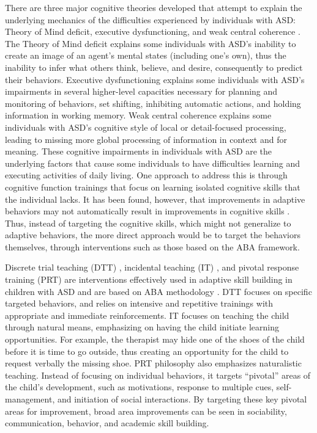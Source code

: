 There are three major cognitive theories developed that attempt to explain the underlying mechanics of the difficulties experienced by individuals with ASD: Theory of Mind deficit, executive dysfunctioning, and weak central coherence \cite{rajendran2007cognitive}.  The Theory of Mind deficit explains some individuals with ASD's inability to create an image of an agent's mental states (including one's own), thus the inability to infer what others think, believe, and desire, consequently to predict their behaviors.  Executive dysfunctioning explains some individuals with ASD's impairments in several higher-level capacities necessary for planning and monitoring of behaviors, set shifting, inhibiting automatic actions, and holding information in working memory.  Weak central coherence explains some individuals with ASD's cognitive style of local or detail-focused processing, leading to missing more global processing of information in context and for meaning.  These cognitive impairments in individuals with ASD are the underlying factors that cause some individuals to have difficulties learning and executing activities of daily living.  One approach to address this is through cognitive function trainings that focus on learning isolated cognitive skills that the individual lacks.  It has been found, however, that improvements in adaptive behaviors may not automatically result in improvements in cognitive skills \cite{chin2000teaching, teunisse2007cognitieve}.  Thus, instead of targeting the cognitive skills, which might not generalize to adaptive behaviors, the more direct approach would be to target the behaviors themselves, through interventions such as those based on the ABA framework.

Discrete trial teaching (DTT) \cite{howard2005comparison}, incidental teaching (IT) \cite{mcgee1986extension}, and pivotal response training (PRT) \cite{koegel2003teaching} are interventions effectively used in adaptive skill building in children with ASD and are based on ABA methodology \cite{palmen2013behavioral}.  DTT focuses on specific targeted behaviors, and relies on intensive and repetitive trainings with appropriate and immediate reinforcements.  IT focuses on teaching the child through natural means, emphasizing on having the child initiate learning opportunities.  For example, the therapist may hide one of the shoes of the child before it is time to go outside, thus creating an opportunity for the child to request verbally the missing shoe.  PRT philosophy also emphasizes naturalistic teaching.  Instead of focusing on individual behaviors, it targets ``pivotal'' areas of the child's development, such as motivations, response to multiple cues, self-management, and initiation of social interactions.  By targeting these key pivotal areas for improvement, broad area improvements can be seen in sociability, communication, behavior, and academic skill building.

